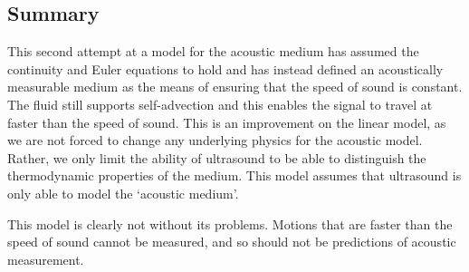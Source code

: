





\subsection{Summary}

This second attempt at a model for the acoustic medium has assumed the continuity and Euler equations to hold
and has instead defined an acoustically measurable medium as the means of ensuring that the speed of sound is constant.
The fluid still supports self-advection and this enables the signal to travel at faster than the speed of sound.
This is an improvement on the linear model, 
as we are not forced to change any underlying physics for the acoustic model.
Rather, we only limit the ability of ultrasound to be able to distinguish the thermodynamic properties of the medium.
This model assumes that ultrasound is only able to model the `acoustic medium'. 


This model is clearly not without its problems.
Motions that are faster than the speed of sound cannot be measured,
and so should not be predictions of acoustic measurement.

